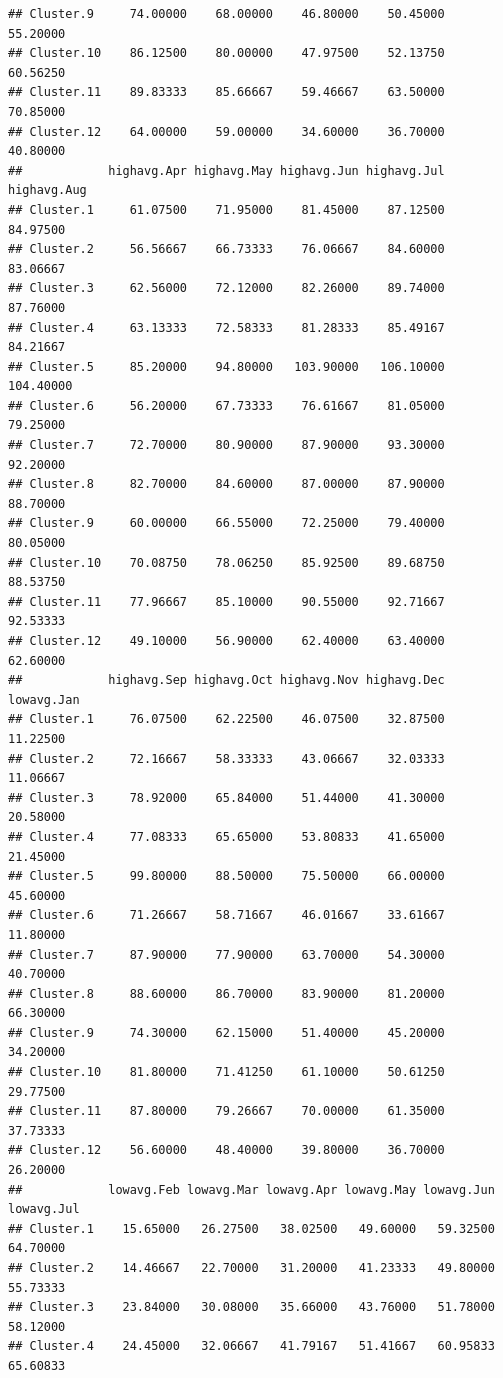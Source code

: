 \documentclass[
]{article}
\begin{document}
\begin{verbatim}
## Cluster.9     74.00000    68.00000    46.80000    50.45000    55.20000
## Cluster.10    86.12500    80.00000    47.97500    52.13750    60.56250
## Cluster.11    89.83333    85.66667    59.46667    63.50000    70.85000
## Cluster.12    64.00000    59.00000    34.60000    36.70000    40.80000
##            highavg.Apr highavg.May highavg.Jun highavg.Jul highavg.Aug
## Cluster.1     61.07500    71.95000    81.45000    87.12500    84.97500
## Cluster.2     56.56667    66.73333    76.06667    84.60000    83.06667
## Cluster.3     62.56000    72.12000    82.26000    89.74000    87.76000
## Cluster.4     63.13333    72.58333    81.28333    85.49167    84.21667
## Cluster.5     85.20000    94.80000   103.90000   106.10000   104.40000
## Cluster.6     56.20000    67.73333    76.61667    81.05000    79.25000
## Cluster.7     72.70000    80.90000    87.90000    93.30000    92.20000
## Cluster.8     82.70000    84.60000    87.00000    87.90000    88.70000
## Cluster.9     60.00000    66.55000    72.25000    79.40000    80.05000
## Cluster.10    70.08750    78.06250    85.92500    89.68750    88.53750
## Cluster.11    77.96667    85.10000    90.55000    92.71667    92.53333
## Cluster.12    49.10000    56.90000    62.40000    63.40000    62.60000
##            highavg.Sep highavg.Oct highavg.Nov highavg.Dec lowavg.Jan
## Cluster.1     76.07500    62.22500    46.07500    32.87500   11.22500
## Cluster.2     72.16667    58.33333    43.06667    32.03333   11.06667
## Cluster.3     78.92000    65.84000    51.44000    41.30000   20.58000
## Cluster.4     77.08333    65.65000    53.80833    41.65000   21.45000
## Cluster.5     99.80000    88.50000    75.50000    66.00000   45.60000
## Cluster.6     71.26667    58.71667    46.01667    33.61667   11.80000
## Cluster.7     87.90000    77.90000    63.70000    54.30000   40.70000
## Cluster.8     88.60000    86.70000    83.90000    81.20000   66.30000
## Cluster.9     74.30000    62.15000    51.40000    45.20000   34.20000
## Cluster.10    81.80000    71.41250    61.10000    50.61250   29.77500
## Cluster.11    87.80000    79.26667    70.00000    61.35000   37.73333
## Cluster.12    56.60000    48.40000    39.80000    36.70000   26.20000
##            lowavg.Feb lowavg.Mar lowavg.Apr lowavg.May lowavg.Jun lowavg.Jul
## Cluster.1    15.65000   26.27500   38.02500   49.60000   59.32500   64.70000
## Cluster.2    14.46667   22.70000   31.20000   41.23333   49.80000   55.73333
## Cluster.3    23.84000   30.08000   35.66000   43.76000   51.78000   58.12000
## Cluster.4    24.45000   32.06667   41.79167   51.41667   60.95833   65.60833

\end{verbatim}
\end{document}
